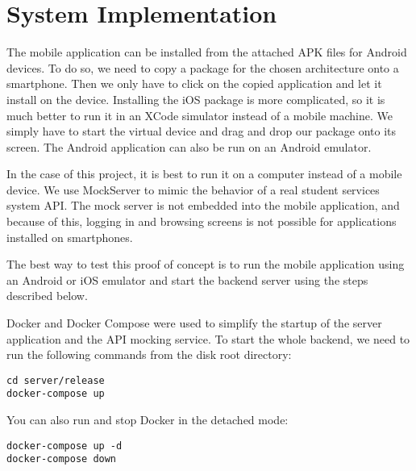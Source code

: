 \chapter{System Implementation}
The mobile application can be installed from the attached APK files for Android devices. To do so, we need to copy a package for the chosen architecture onto a smartphone. Then we only have to click on the copied application and let it install on the device. Installing the iOS package is more complicated, so it is much better to run it in an XCode simulator instead of a mobile machine. We simply have to start the virtual device and drag and drop our package onto its screen. The Android application can also be run on an Android emulator.

In the case of this project, it is best to run it on a computer instead of a mobile device. We use MockServer to mimic the behavior of a real student services system API. The mock server is not embedded into the mobile application, and because of this, logging in and browsing screens is not possible for applications installed on smartphones.

The best way to test this proof of concept is to run the mobile application using an Android or iOS emulator and start the backend server using the steps described below.

Docker and Docker Compose were used to simplify the startup of the server application and the API mocking service. To start the whole backend, we need to run the following commands from the disk root directory:
\begin{lstlisting}[numbers=none]
cd server/release
docker-compose up
\end{lstlisting}

\noindent You can also run and stop Docker in the detached mode:
\begin{lstlisting}[numbers=none]
docker-compose up -d
docker-compose down
\end{lstlisting}